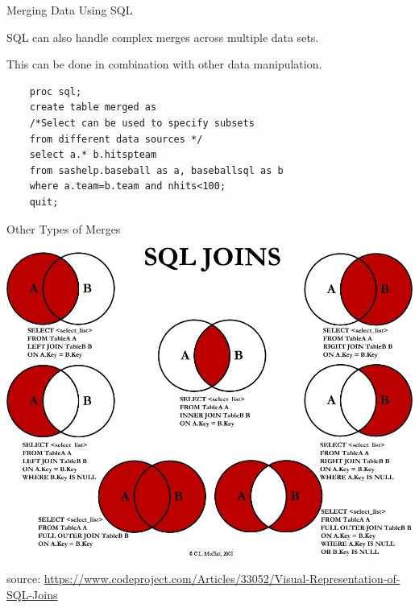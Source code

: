 \documentclass{beamer}
\begin{document}
\begin{frame}[fragile]{Merging Data Using SQL}
\item SQL can also handle complex merges across multiple data sets.
\item This can be done in combination with other data manipulation.
\begin{verbatim}
    proc sql;
    create table merged as
    /*Select can be used to specify subsets
    from different data sources */
    select a.* b.hitspteam 
    from sashelp.baseball as a, baseballsql as b
    where a.team=b.team and nhits<100;
    quit;
\end{verbatim}
\end{frame}

\begin{frame}{Other Types of Merges}
\includegraphics[width=.8\linewidth]{SQL_joins.jpg}
\begin{tiny}
\linebreak
source: \url{https://www.codeproject.com/Articles/33052/Visual-Representation-of-SQL-Joins}
\end{tiny}
\end{frame}
\end{document}
